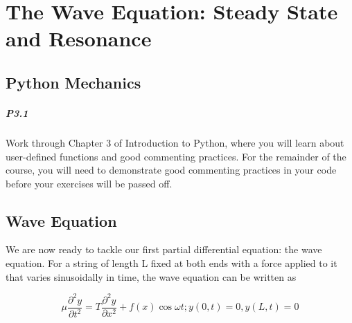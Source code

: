 \documentclass{book}
\theoremstyle{plain}
\theoremstyle{definition}
\numberwithin{exm}{chapter}
\theoremstyle{remark}
\theoremstyle{summary}
\theoremstyle{overview}
\begin{document}
\chapter*{The Wave Equation: Steady State and Resonance}
\section*{Python Mechanics}

\paragraph*{P3.1} Work through Chapter 3 of Introduction to Python, where you will learn
about user-defined functions and good commenting practices. For the
remainder of the course, you will need to demonstrate good commenting
practices in your code before your exercises will be passed off.
\section*{Wave Equation}

We are now ready to tackle our first partial differential equation: the wave equation. For a string of length L fixed at both ends with a force applied to it that varies
sinusoidally in time, the wave equation can be written as


\begin{equation}\label{eq:31}
		\mu \frac{\partial^2 y}{\partial t^2} = T \frac{\partial^2y}{\partial x^2} + f(x) \cos \omega t ; y(0,t) = 0, y(L,t) = 0
				\end{equation}
				
\end{document}
